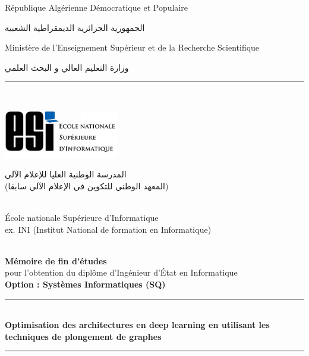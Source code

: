 \documentclass[a4paper,12pt]{report}
\begin{document}
\begin{titlepage}
    \centering
    {\small République Algérienne Démocratique et Populaire}\\
    \begin{Arabic}
    الجمهورية الجزائرية الديمقراطية الشعبية \\
	\end{Arabic}
    {\small Ministère de l'Enseignement Supérieur et de la Recherche Scientifique}\\
        \begin{Arabic}
        وزارة التعليم العالي و البحث العلمي \\
	\end{Arabic}
\rule{\linewidth}{0.3mm} \\[0.4cm]

\begin{minipage}{5cm}
	\begin{center}
		\includegraphics[width=5cm]{esi_logo.png}
	\end{center}
\end{minipage}\hfill
\begin{minipage}{10cm}
	\begin{flushright}
	\begin{Arabic}
	المدرسة الوطنية العليا للإعلام الآلي \\
	(المعهد الوطني للتكوين في الإعلام الآلي سابقا)
	\end{Arabic}\\
	{\small École nationale Supérieure d'Informatique}\\[0.1cm]
    {\small ex. INI (Institut National de formation en Informatique)}\\[0.1cm]
	\end{flushright}
\end{minipage}\hfill\\
\vspace{20mm}
{\large \bfseries Mémoire de fin d’études}\\[0.5cm]
{\large pour l’obtention du diplôme d’Ingénieur d’État en Informatique}\\[0.5cm]
{\large \bfseries{Option : Systèmes Informatiques (SQ)} \\ }
\vspace{10mm}
\rule{\linewidth}{0.3mm} \\[0.4cm]
{ \LARGE \bfseries Optimisation des architectures en deep learning en utilisant les techniques de plongement de graphes\\[0.4cm] }
\rule{\linewidth}{0.3mm} \\[1cm]
\vspace{10mm}


\end{titlepage}
\end{document}
